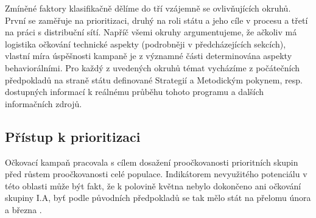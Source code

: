 Zmíněné faktory klasifikačně dělíme do tří vzájemně se ovlivňujících okruhů. První se zaměřuje na prioritizaci, druhý na roli státu a jeho cíle v procesu a třetí na práci s distribuční sítí. %
%
Napříč všemi okruhy argumentujeme, že ačkoliv má logistika očkování technické aspekty (podrobněji v předcházejících sekcích), vlastní míra úspěšnosti kampaně je z významné části determinována aspekty behaviorálními. Pro každý z uvedených okruhů témat vycházíme z počátečních předpokladů na straně státu definované Strategií a Metodickým pokynem, resp. dostupných informací k reálnému průběhu tohoto programu a dalších informačních zdrojů.


\subsection*{Přístup k prioritizaci} 

Očkovací kampaň pracovala s cílem dosažení proočkovanosti prioritních skupin před růstem proočkovanosti celé populace. Indikátorem nevyužitého potenciálu v této oblasti může být fakt, že k polovině května nebylo dokončeno ani očkování skupiny I.A, byť podle původních předpokladů se tak mělo stát na přelomu února a března \cite{ockovani_mp}.


